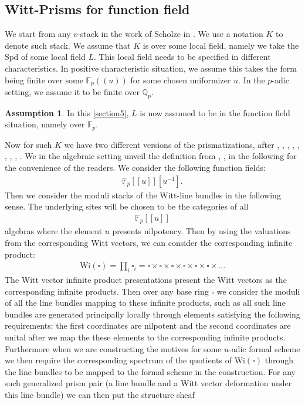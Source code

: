 \documentclass[12pt]{article}
\theoremstyle{definition}
\newtheorem{assumption}{Assumption}
\begin{document}
\subsection{Witt-Prisms for function field}
\indent We start from any $v$-stack in the work of Scholze in \cite{1S1}. We use a notation $K$ to denote such stack. We assume that $K$ is over some local field, namely we take the $\mathrm{Spd}$ of some local field $L$. This local field needs to be specified in different characteristics. In positive characteristic situation, we assume this takes the form being finite over some $\mathbb{F}_p((u))$ for some chosen uniformizer $u$. In the $p$-adic setting, we assume it to be finite over $\mathbb{Q}_p$. 
\begin{assumption}
In this \cref{section5}, $L$ is now assumed to be in the function field situation, namely over $\mathbb{F}_p$.
\end{assumption}
Now for such $K$ we have two different versions of the prismatizations, after \cite{1To1}, \cite{1To2}, \cite{1To3}, \cite{1To4}, \cite{1S4}, \cite{1ALBRCS}, \cite{1BS}, \cite{1D}, \cite{1BL}. We in the algebraic setting unveil the definition from \cite{1BS}, \cite{1D}, \cite{1BL} in the following for the convenience of the readers. We consider the following function fields:
\begin{align}
\mathbb{F}_p[[u]][u^{-1}].
\end{align}
Then we consider the moduli stacks of the Witt-line bundles in the following sense. The underlying sites will be chosen to be the categories of all 
\begin{align}
\mathbb{F}_p[[u]]
\end{align}
algebras where the element $u$ presents nilpotency. Then by using the valuations from the corresponding Witt vectors, we can consider the corresponding infinite product:
\begin{align}
\mathrm{Wi(\square)}=\prod_i \square_i = \square \times \square \times \square \times \square \times \square\times \square \times... 
\end{align} 
The Witt vector infinite product presentations present the Witt vectors as the corresponding infinite products. Then over any base ring $\square$ we consider the moduli of all the line bundles mapping to these infinite products, such as all such line bundles are generated principally locally through elements satisfying the following requirements: the first coordinates are nilpotent and the second coordinates are unital after we map the these elements to the corresponding infinite products. Furthermore when we are constructing the motives for some $u$-adic formal scheme we then require the corresponding spectrum of the quotients of $\mathrm{Wi}(\square)$ through the line bundles to be mapped to the formal scheme in the construction. For any such generalized prism pair (a line bundle and a Witt vector deformation under this line bundle) we can then put the structure sheaf
\end{document}
